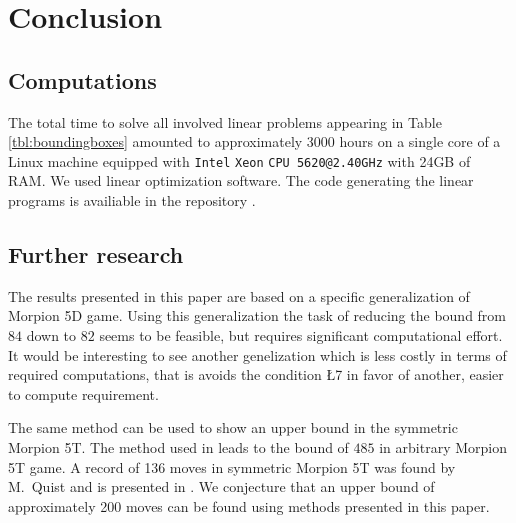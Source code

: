 \section{Conclusion}

\subsection{Computations}
The total time to solve all involved linear problems appearing in Table \ref{tbl:boundingboxes} amounted to approximately 3000 hours on a single core of a 
Linux machine equipped with {\tt Intel\textsuperscript{\textregistered}} {\tt Xeon\textsuperscript{\textregistered}} {\tt CPU 5620@2.40GHz} with 24GB of RAM. 
We used \cite{gurobi} linear optimization software. The code generating the linear programs is availiable in the repository \cite{thewebpage}. 

\subsection{Further research}
The results presented in this paper are based on a specific generalization of Morpion 5D game. Using this generalization the 
task of reducing the bound from $84$ down to $82$ seems to be feasible, but requires significant computational effort. It would be interesting
to see another genelization which is less costly in terms of required computations, that is avoids the condition \L{7} in favor of another, easier to compute 
requirement. 

The same method can be used to show an upper bound in the symmetric Morpion 5T. The method used in \cite{ijcai} leads to the bound of $485$ in arbitrary Morpion 5T game. 
A record of 136 moves in symmetric Morpion 5T was found by M.~Quist and is presented in \cite{boyer}. We conjecture that an upper bound of approximately 200 moves can be found
using methods presented in this paper.  


